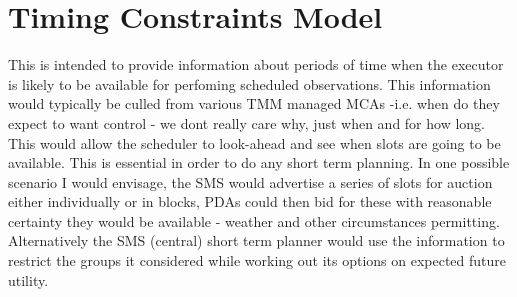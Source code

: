 \section{Timing Constraints Model} 
This is intended to provide information about periods of time when the executor is likely to be available for perfoming scheduled observations. This information would typically be culled from various TMM managed MCAs -i.e. when do they expect to want control - we dont really care why, just when and for how long. This would allow the scheduler to look-ahead and see when slots are going to be available. This is essential in order to do any short term planning. In one possible scenario I would envisage, the SMS would advertise a series of slots for auction either individually or in blocks, PDAs could then bid for these with reasonable certainty they would be available - weather and other circumstances permitting. Alternatively the SMS (central) short term planner would use the information to restrict the groups it considered while working out its options on expected future utility.
